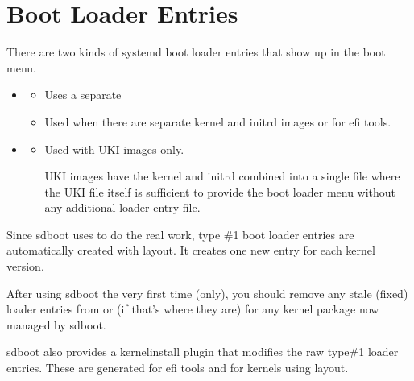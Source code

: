 \documentclass[letterpaper,11pt,english]{sphinxmanual}
\begin{document}
\chapter{Boot Loader Entries}
\label{\detokenize{Loader-Entries:boot-loader-entries}}\label{\detokenize{Loader-Entries::doc}}
\sphinxAtStartPar
There are two kinds of systemd boot loader entries that show up in the boot menu.
\begin{itemize}
\item {} 
\sphinxAtStartPar
{}
\begin{itemize}
\item {} 
\sphinxAtStartPar
Uses a separate 

\item {} 
\sphinxAtStartPar
Used when there are separate kernel and initrd images or for efi tools.

\end{itemize}

\item {} 
\sphinxAtStartPar
{}
\begin{itemize}
\item {} 
\sphinxAtStartPar
Used with UKI images only.

\sphinxAtStartPar
UKI images have the kernel and initrd combined into a single file where
the UKI file itself is sufficient to provide the boot loader menu without
any additional loader entry file.

\end{itemize}

\end{itemize}

\sphinxAtStartPar
Since sd\sphinxhyphen{}boot uses  to do the real work, type \#1 boot loader entries are
automatically created with  layout. It creates one new entry for each kernel version.

\sphinxAtStartPar
After using sd\sphinxhyphen{}boot the very first time (only), you should remove any stale (fixed) loader
entries from  or  (if that’s where they are) for
any kernel package now managed by sd\sphinxhyphen{}boot.

\sphinxAtStartPar
sd\sphinxhyphen{}boot also provides a kernel\sphinxhyphen{}install plugin that modifies the raw type\#1 loader entries.
These are generated for efi tools and for kernels using  layout.
\end{document}
